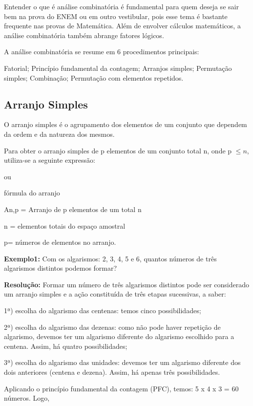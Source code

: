 \begin{multicols*}{2}
Entender o que é análise combinatória é fundamental para quem deseja se sair bem na prova do ENEM ou em outro vestibular, pois esse tema é bastante frequente nas provas de Matemática. Além de envolver cálculos matemáticos, a análise combinatória também abrange fatores lógicos.

A análise combinatória se resume em 6 procedimentos principais:

Fatorial;
Princípio fundamental da contagem;
Arranjos simples;
Permutação simples;
Combinação;
Permutação com elementos repetidos.

\subsection{Arranjo Simples}
	
	O arranjo simples é o agrupamento dos elementos de um conjunto que dependem da ordem e da natureza dos mesmos.

Para obter o arranjo simples de p elementos de um conjunto total  n, onde p $\leq n$, utiliza-se a seguinte expressão:

 ou 

fórmula do arranjo

An,p = Arranjo de p elementos de um total n

n = elementos totais do espaço amostral

p= números de elementos no arranjo.

\textbf{Exemplo1:} Com os algarismos: 2, 3, 4, 5 e 6, quantos números de três algarismos distintos podemos formar?

\textbf{Resolução:} Formar um número de três algarismos distintos pode ser considerado um arranjo simples e a ação constituída de três etapas sucessivas, a saber:

1ª) escolha do algarismo das centenas: temos cinco possibilidades;

2ª) escolha do algarismo das dezenas: como não pode haver repetição de algarismo, devemos ter um algarismo diferente do algarismo escolhido para a centena. Assim, há quatro possibilidades;

3ª) escolha do algarismo das unidades: devemos ter um algarismo diferente dos dois anteriores (centena e dezena). Assim, há apenas três possibilidades.

Aplicando o princípio fundamental da contagem (PFC), temos: 5 x 4 x 3 = 60 números. Logo,


\end{multicols*}

